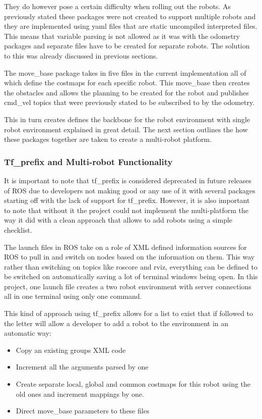       They do however pose a certain difficulty when rolling out the robots. As previously stated these packages were not created to support multiple robots and they are implemented using yaml files that are static uncompiled interpreted files. This means that variable parsing is not allowed as it was with the odometry packages and separate files have to be created for separate robots. The solution to this was already discussed in previous sections.

      The move\_base package takes in five files in the current implementation all of which define the costmaps for each specific robot. This move\_base then creates the obstacles and allows the planning to be created for the robot and publishes cmd\_vel topics that were previously stated to be subscribed to by the odometry.

      This in turn creates defines the backbone for the robot environment with single robot environment explained in great detail. The next section outlines the how these packages together are taken to create a multi-robot platform.

    \subsubsection{Tf\_prefix and Multi-robot Functionality}
      It is important to note that tf\_prefix is considered deprecated in future releases of ROS due to developers not making good or any use of it with several packages starting off with the lack of support for tf\_prefix. However, it is also important to note that without it the project could not implement the multi-platform the way it did with a clean approach that allows to add robots using a simple checklist.

      The launch files in ROS take on a role of XML defined information sources for ROS to pull in and switch on nodes based on the information on them. This way rather than switching on topics like roscore and rviz, everything can be defined to be switched on automatically saving a lot of terminal windows being open. In this project, one launch file creates a two robot environment with server connections all in one terminal using only one command.

      This kind of approach using tf\_prefix allows for a list to exist that if followed to the letter will allow a developer to add a robot to the environment in an automatic way:
        \begin{itemize}
          \item Copy an existing groups XML code
          \item Increment all the arguments parsed by one
          \item Create separate local, global and common costmaps for this robot using the old ones and increment mappings by one.
          \item Direct move\_base parameters to these files
        \end{itemize}

